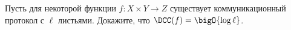 Пусть для некоторой функции $f\colon X \times Y \to Z$ существует коммуникационный протокол с $\ell$
листьями. Докажите, что $\DCC(f) = \bigO{\log \ell}$.